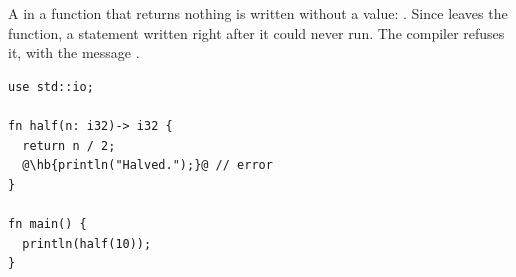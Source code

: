 A  in a function that returns nothing is written without a value:
. Since  leaves the function, a statement written
right after it could never run. The compiler refuses it, with the message
.

\begin{lstlisting}[style=coloredverbatimError, escapechar=@, caption=A statement after \token{return}]
use std::io;

fn half(n: i32)-> i32 {
  return n / 2;
  @\hb{println("Halved.");}@ // error
}

fn main() {
  println(half(10));
}
\end{lstlisting}
